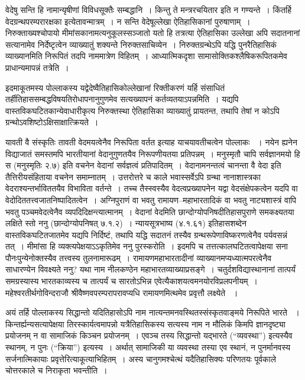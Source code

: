 वेदेषु सन्ति हि नामान्यृषीणां विविधसूक्तैः सम्बद्धानि~। किन्तु ते मन्त्ररचयितार इति न गण्यन्ते~। किंतर्हि वेदग्रन्थपरम्परारक्षका इत्येतावन्मात्रम्~। न सन्ति वेदेषूल्लेखा ऐतिहासिकानां पुरुषाणाम्~। निरुक्ताख्यश्चोपायो मीमांसकानामत्यनुकूलस्सञ्जातो यतो हि तत्रत्या ऐतिहासिका उल्लेखा अपि सदातनानां सत्यानामेव निर्देष्टृत्वेन व्याख्यातुं शक्यन्ते निरुक्तसाचिव्येन~। निरुक्तग्रन्थेऽपि यद्धि पुनरैतिहासिकं व्याख्यानमिति निरूपितं तदपि नाममात्रेण विहितम्~। आध्यात्मिकदृशा सामासोक्तिकश्लैषिकरूपितकमेव प्राधान्यमापन्नं तत्रेति~।

इदमाकूतमस्य पोल्लाकस्य यद्वेदेष्वैतिहासिकोल्लेखानां रिक्तीकरणं यर्हि संसाधितं तर्हीतिहाससम्बद्धविषयतिरोधापनानुगुणमेव सत्यख्यापनं कर्तव्यतयाऽपन्नमिति~।  यद्यपि वास्तविकघटितकान्येवाधारीकृत्य निरुक्तस्था ऐतिहासिका व्याख्यातुं प्रायतन्त, तथापि तेषां न कोऽपि ग्रन्थोऽवशिष्टोऽक्षिसाक्षात्क्रियते~।

यावती वै संस्कृतिः तावती वेदमयत्वेनैव निरूपिता वर्तत इत्याह याचयावतीचत्वेन पोल्लाकः ~। नयेन ह्यनेन विद्याजातं समस्तमपि भारतीयानां वेदानुगुणतयैव निरूपणीयतया प्रतिपन्नम्~। मनुस्मृतौ चापि सर्वज्ञानमयो हि स (मनुस्मृतिः २.७) इति वचनेन वेदानां सर्वज्ञत्वं प्रतिपादितम्~। वेदानामनन्तत्वं चानन्ता वै वेदा इति तैत्तिरीयसंहिताया वचनेन  समाम्नातम्~। उत्तरोत्तरे च काले भवास्सर्वेऽपि ग्रन्था नानाशास्त्रका वेदराश्यन्तर्भाविततयैव विभाविता वर्तन्ते~। तच्च तैस्स्वस्यैव वेदत्वप्रख्यापनेन यद्वा वेदसंक्षेपकत्वेन यदपि वा वेदोदिततत्त्वजातनिष्पादितत्वेन~। अग्निपुराणं वा भवतु रामायण–महाभारतादिकं वा भवतु नाट्यशास्त्रं वापि भवतु पञ्चमवेदत्वेनैव व्यपदिदिक्षन्त्यात्मानम्~। वेदानां वेदमिति छान्दोग्योपनिषदीतिहासपुराणे समकक्ष्यतया लक्षिते स्तो ननु (छान्दोग्योपनिषत् ७.१.२)~। न्यायसूत्रभाष्य (४.१.६१) इतिहासशब्देन वास्तविकघटितजातमेव यद्यपि निर्दिष्टं, तथापि यद्धि सदातनं तस्यैव ग्रन्थरूपेणाविष्करणत्वेनैव पर्यवसन्नं तत्~। मीमांसा हि व्यक्त्यपेक्षयाऽऽकृतिमेव ननु पुरस्करोति~। इदमपि च तत्तत्कालघटितत्वापेक्षया सना पौनःपुन्येनोक्तस्यैव तत्त्वस्य तुलनामारूढम्~। रामायणमहाभारतादीनां व्याख्यानमप्यध्यात्मपरत्वेनैव साधारण्येन विवक्ष्यते ननु? यथा नाम नीलकण्ठेन महाभारतव्याख्याप्रसङ्गे~। चतुर्दशविद्यास्थानानां तात्पर्यं समग्रस्यास्य भारतकाव्यस्य च तात्पर्यं च सारतोऽभिन्न एवेत्यैकाशयत्वमनयोरविप्रलपनीयम्~। महेश्वरतीर्थगोविन्दराजौ श्रीवैष्णवपरम्परापरावप्यधि रामायणमित्थमेव प्रवृत्तौ लक्ष्येते ~।

अयं तर्हि पोल्लाकस्य सिद्धान्तो यदितिहासोऽपि नाम नात्यन्तमनवस्थितस्संस्कृतवाङ्मये निरूपिते भारते ~। किन्तर्ह्यन्यसत्यापेक्षया तिरस्कार्यत्वमापन्नो यत्रैतिहासिकस्य सत्यस्य नाम न मौलिकं किमपि ज्ञानदृष्ट्या प्रयोजनम् न वा सामाजिकं किञ्चन प्रयोजनम्~। एवञ्च तस्य सिद्धान्तो यद्भारते  (“व्यवस्था”) इत्यस्यैव स्थानम्, न पुनः (“क्रिया”) इत्यस्य~। अर्थात् सामाजिकी या व्यवस्था तस्या एव स्थानं, न पुनर्मानवस्य सर्जनात्मिकायाः प्रवृत्तेरित्याकूत्याभिहितम्~। अस्य चानुगमश्चेत्थं यदैतिहासिक्यः परिणतयः  पूर्वकाले चोत्तरकाले च निराकृता भवन्तीति~।


